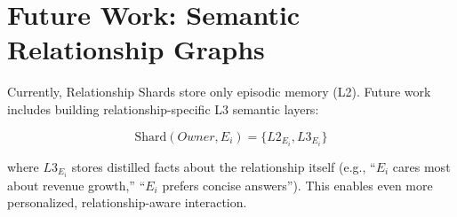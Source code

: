 \section{Future Work: Semantic Relationship Graphs}

Currently, Relationship Shards store only episodic memory (L2). Future work includes building relationship-specific L3 semantic layers:

\[
\text{Shard}(Owner, E_i) = \{ L2_{E_i}, L3_{E_i} \}
\]

where $L3_{E_i}$ stores distilled facts about the relationship itself (e.g., ``$E_i$ cares most about revenue growth,'' ``$E_i$ prefers concise answers''). This enables even more personalized, relationship-aware interaction.
